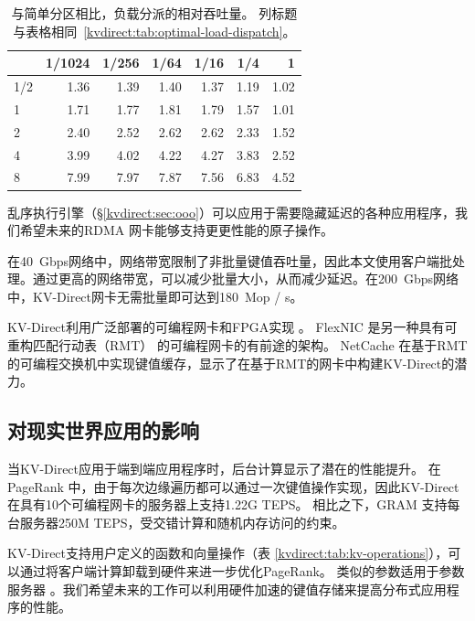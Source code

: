 \begin{table}[t]
	\centering
	\caption{与简单分区相比，负载分派的相对吞吐量。 列标题与表格相同~\ref{kvdirect:tab:optimal-load-dispatch}。}
	\label{kvdirect:tab:optimal-load-dispatch-throughput}
	\small
	\begin{tabular}{|l|r|r|r|r|r|r|}
		\hline
		& 1/1024 & 1/256 & 1/64 & 1/16 & 1/4 & 1 \\
		\hline
		1/2 & 1.36	& 1.39	& 1.40	& 1.37	& 1.19	& 1.02 \\ 
		\hline
		1	& 1.71	& 1.77	& 1.81	& 1.79	& 1.57	& 1.01 \\
		\hline
		2	& 2.40	& 2.52	& 2.62	& 2.62	& 2.33	& 1.52 \\
		\hline
		4	& 3.99	& 4.02	& 4.22	& 4.27	& 3.83	& 2.52 \\
		\hline
		8	& 7.99	& 7.97	& 7.87	& 7.56	& 6.83	& 4.52 \\
		\hline
	\end{tabular}
\end{table}


乱序执行引擎（\S \ref {kvdirect:sec:ooo}）可以应用于需要隐藏延迟的各种应用程序，我们希望未来的RDMA 网卡能够支持更更性能的原子操作。

在40~Gbps网络中，网络带宽限制了非批量键值吞吐量，因此本文使用客户端批处理。通过更高的网络带宽，可以减少批量大小，从而减少延迟。在200~Gbps网络中，KV-Direct网卡无需批量即可达到180~Mop / s。

KV-Direct利用广泛部署的可编程网卡和FPGA实现 \cite{putnam2014reconfigurable,caulfield2016cloud}。 FlexNIC \cite {kaufmann2015flexnic,kaufmann2016krishnamurthy} 是另一种具有可重构匹配行动表（RMT） \cite {bosshart2013forwarding} 的可编程网卡的有前途的架构。
NetCache \cite {netcache-sosp17} 在基于RMT的可编程交换机中实现键值缓存，显示了在基于RMT的网卡中构建KV-Direct的潜力。

\subsection{对现实世界应用的影响}

当KV-Direct应用于端到端应用程序时，后台计算显示了潜在的性能提升。 在PageRank \cite {page1999pagerank}中，由于每次边缘遍历都可以通过一次键值操作实现，因此KV-Direct在具有10个可编程网卡的服务器上支持1.22G TEPS。 相比之下，GRAM \cite {wu2015g}支持每台服务器250M TEPS，受交错计算和随机内存访问的约束。

KV-Direct支持用户定义的函数和向量操作（表 \ref {kvdirect:tab:kv-operations}），可以通过将客户端计算卸载到硬件来进一步优化PageRank。 类似的参数适用于参数服务器 \cite {li2014scaling}。我们希望未来的工作可以利用硬件加速的键值存储来提高分布式应用程序的性能。

